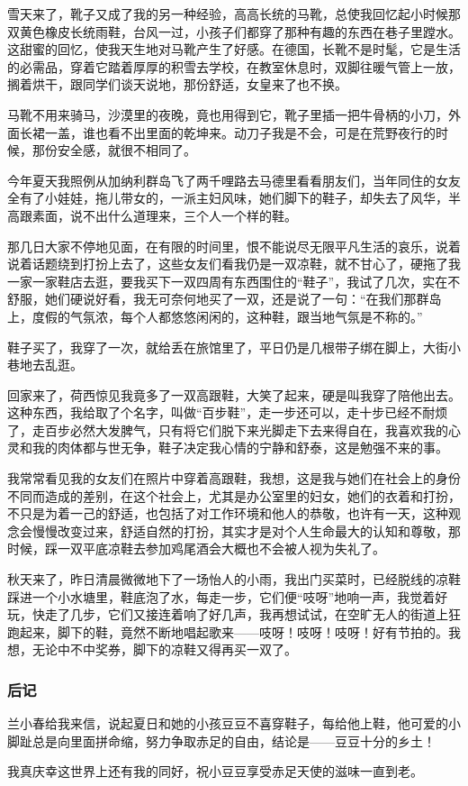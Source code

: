 \par 雪天来了，靴子又成了我的另一种经验，高高长统的马靴，总使我回忆起小时候那双黄色橡皮长统雨鞋，台风一过，小孩子们都穿了那种有趣的东西在巷子里蹚水。这甜蜜的回忆，使我天生地对马靴产生了好感。在德国，长靴不是时髦，它是生活的必需品，穿着它踏着厚厚的积雪去学校，在教室休息时，双脚往暖气管上一放，搁着烘干，跟同学们谈天说地，那份舒适，女皇来了也不换。
\par 马靴不用来骑马，沙漠里的夜晚，竟也用得到它，靴子里插一把牛骨柄的小刀，外面长裙一盖，谁也看不出里面的乾坤来。动刀子我是不会，可是在荒野夜行的时候，那份安全感，就很不相同了。
\par 今年夏天我照例从加纳利群岛飞了两千哩路去马德里看看朋友们，当年同住的女友全有了小娃娃，拖儿带女的，一派主妇风味，她们脚下的鞋子，却失去了风华，半高跟素面，说不出什么道理来，三个人一个样的鞋。
\par 那几日大家不停地见面，在有限的时间里，恨不能说尽无限平凡生活的哀乐，说着说着话题绕到打扮上去了，这些女友们看我仍是一双凉鞋，就不甘心了，硬拖了我一家一家鞋店去逛，要我买下一双四周有东西围住的“鞋子”，我试了几次，实在不舒服，她们硬说好看，我无可奈何地买了一双，还是说了一句：“在我们那群岛上，度假的气氛浓，每个人都悠悠闲闲的，这种鞋，跟当地气氛是不称的。”
\par 鞋子买了，我穿了一次，就给丢在旅馆里了，平日仍是几根带子绑在脚上，大街小巷地去乱逛。
\par 回家来了，荷西惊见我竟多了一双高跟鞋，大笑了起来，硬是叫我穿了陪他出去。这种东西，我给取了个名字，叫做“百步鞋”，走一步还可以，走十步已经不耐烦了，走百步必然大发脾气，只有将它们脱下来光脚走下去来得自在，我喜欢我的心灵和我的肉体都与世无争，鞋子决定我心情的宁静和舒泰，这是勉强不来的事。
\par 我常常看见我的女友们在照片中穿着高跟鞋，我想，这是我与她们在社会上的身份不同而造成的差别，在这个社会上，尤其是办公室里的妇女，她们的衣着和打扮，不只是为着一己的舒适，也包括了对工作环境和他人的恭敬，也许有一天，这种观念会慢慢改变过来，舒适自然的打扮，其实才是对个人生命最大的认知和尊敬，那时候，踩一双平底凉鞋去参加鸡尾酒会大概也不会被人视为失礼了。
\par 秋天来了，昨日清晨微微地下了一场怡人的小雨，我出门买菜时，已经脱线的凉鞋踩进一个小水塘里，鞋底泡了水，每走一步，它们便“吱呀”地响一声，我觉着好玩，快走了几步，它们又接连着响了好几声，我再想试试，在空旷无人的街道上狂跑起来，脚下的鞋，竟然不断地唱起歌来——吱呀！吱呀！吱呀！好有节拍的。我想，无论中不中奖券，脚下的凉鞋又得再买一双了。
\subsubsection*{后记}
\par 兰小春给我来信，说起夏日和她的小孩豆豆不喜穿鞋子，每给他上鞋，他可爱的小脚趾总是向里面拼命缩，努力争取赤足的自由，结论是——豆豆十分的乡土！
\par 我真庆幸这世界上还有我的同好，祝小豆豆享受赤足天使的滋味一直到老。


